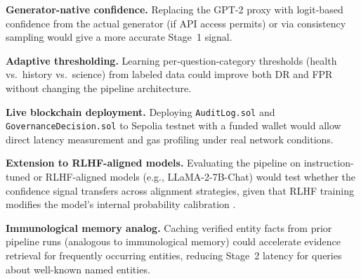 \documentclass[11pt,a4paper]{article}
\begin{document}
\textbf{Generator-native confidence.} Replacing the GPT-2 proxy with
logit-based confidence from the actual generator (if API access permits) or via
consistency sampling \citep{chuang2023dola} would give a more accurate Stage~1
signal.

\textbf{Adaptive thresholding.} Learning per-question-category thresholds
(health vs.\ history vs.\ science) from labeled data could improve both DR and
FPR without changing the pipeline architecture.

\textbf{Live blockchain deployment.} Deploying \texttt{AuditLog.sol} and
\texttt{GovernanceDecision.sol} to Sepolia testnet with a funded wallet would
allow direct latency measurement and gas profiling under real network conditions.

\textbf{Extension to RLHF-aligned models.} Evaluating the pipeline on
instruction-tuned or RLHF-aligned models (e.g., LLaMA-2-7B-Chat) would test
whether the confidence signal transfers across alignment strategies, given that
RLHF training modifies the model's internal probability calibration
\citep{ouyang2022training}.

\textbf{Immunological memory analog.} Caching verified entity facts from prior
pipeline runs (analogous to immunological memory) could accelerate evidence
retrieval for frequently occurring entities, reducing Stage~2 latency for
queries about well-known named entities.
\end{document}
